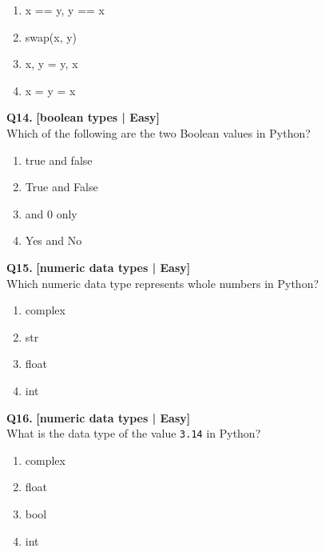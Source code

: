 \begin{enumerate}[label=(\alph*),topsep=2pt,itemsep=1pt,partopsep=0pt,parsep=0pt]
    \item \relax x == y, y == x
    \item \relax swap(x, y)
    \item \relax x, y = y, x
    \item \relax x = y = x
\end{enumerate}
\vspace{2mm}

\noindent\textbf{Q14.} \hfill {\small\color{LPUOrange}\textbf{[boolean types | Easy]}}\\[2pt]
Which of the following are the two Boolean values in Python?

\begin{enumerate}[label=(\alph*),topsep=2pt,itemsep=1pt,partopsep=0pt,parsep=0pt]
    \item \relax true and false
    \item \relax True and False
    \item {} and 0 only
    \item \relax Yes and No
\end{enumerate}
\vspace{2mm}

\noindent\textbf{Q15.} \hfill {\small\color{LPUOrange}\textbf{[numeric data types | Easy]}}\\[2pt]
Which numeric data type represents whole numbers in Python?

\begin{enumerate}[label=(\alph*),topsep=2pt,itemsep=1pt,partopsep=0pt,parsep=0pt]
    \item \relax complex
    \item \relax str
    \item \relax float
    \item \relax int
\end{enumerate}
\vspace{2mm}

\noindent\textbf{Q16.} \hfill {\small\color{LPUOrange}\textbf{[numeric data types | Easy]}}\\[2pt]
What is the data type of the value \texttt{3.14} in Python?

\begin{enumerate}[label=(\alph*),topsep=2pt,itemsep=1pt,partopsep=0pt,parsep=0pt]
    \item \relax complex
    \item \relax float
    \item \relax bool
    \item \relax int
\end{enumerate}
\vspace{2mm}

